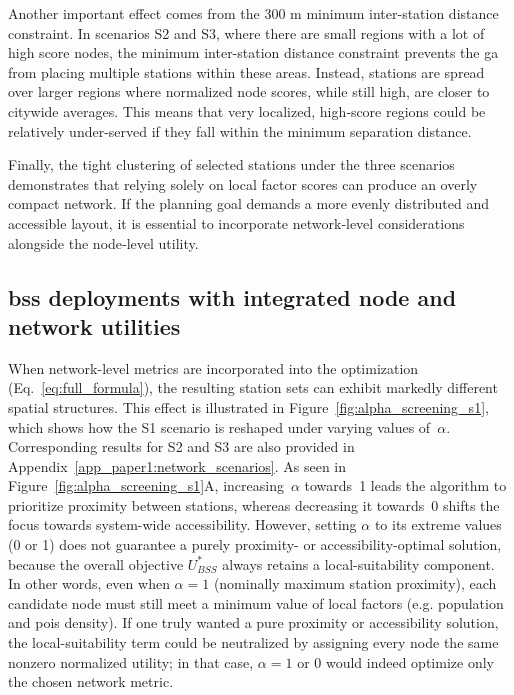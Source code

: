    Another important effect comes from the 300 m minimum inter-station distance constraint. In scenarios S2 and S3, where there are small regions with a lot of high score nodes, the minimum inter-station distance constraint prevents the \ac{ga} from placing multiple stations within these areas. Instead, stations are spread over larger regions where normalized node scores, while still high, are closer to citywide averages. This means that very localized, high‐score regions could be relatively under-served if they fall within the minimum separation distance. 

    Finally, the tight clustering of selected stations under the three scenarios demonstrates that relying solely on local factor scores can produce an overly compact network. If the planning goal demands a more evenly distributed and accessible layout, it is essential to incorporate network‐level considerations alongside the node‐level utility. 

    \subsection[BSS deployments with integrated node and network utilities]{\ac{bss} deployments with integrated node and network utilities}

    When network-level metrics are incorporated into the optimization (Eq.~\ref{eq:full_formula}), the resulting station sets can exhibit markedly different spatial structures. This effect is illustrated in Figure~\ref{fig:alpha_screening_s1}, which shows how the S1 scenario is reshaped under varying values of~$\alpha$. Corresponding results for S2 and S3 are also provided in Appendix~\ref{app_paper1:network_scenarios}. As seen in Figure~\ref{fig:alpha_screening_s1}A, increasing~$\alpha$ towards~1 leads the algorithm to prioritize proximity between stations, whereas decreasing it towards~0 shifts the focus towards system-wide accessibility. However, setting $\alpha$ to its extreme values (0 or 1) does not guarantee a purely proximity- or accessibility-optimal solution, because the overall objective $U_{BSS}^{*}$ always retains a local-suitability component. In other words, even when $\alpha= 1$ (nominally maximum station proximity), each candidate node must still meet a minimum value of local factors (e.g. population and \acp{poi} density). If one truly wanted a pure proximity or accessibility solution, the local-suitability term could be neutralized by assigning every node the same nonzero normalized utility; in that case, $\alpha=1$ or $0$ would indeed optimize only the chosen network metric.

